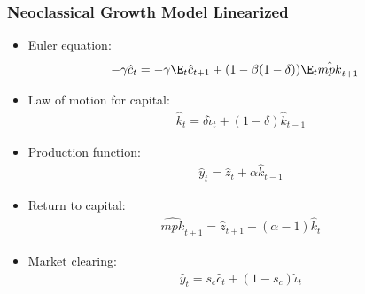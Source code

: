\documentclass[english,xcolor=svgnames]{beamer}
\begin{document}
 \begin{frame}
	\frametitle{Neoclassical Growth Model Linearized}
	\begin{itemize}
		\item Euler equation:
		\begin{align*}
			-\gamma \hat{c}_t &= -\gamma \E_t \hat{c}_{t+1} + (1 - \beta(1-\delta)) \E_t \hat{mpk}_{t+1}
		\end{align*}
		\item Law of motion for capital:
		\begin{align*}
			\hat{k}_{t} =\delta \hat{\iota}_{t} + (1-\delta)\hat{k}_{t-1}
		\end{align*}
		\item Production function:
		\begin{align*}
			\hat{y}_t = \hat{z}_t + \alpha \hat{k}_{t-1}
		\end{align*}
		\item Return to capital:
		\begin{align*}
			\hat{mpk}_{t+1} =  \hat{z}_{t+1} + (\alpha-1) \hat{k}_t 
		\end{align*}
		\item Market clearing:
		\begin{align*}
			\hat{y}_t = s_c \hat{c}_t +(1-s_c) \hat{\iota}_t
		\end{align*}
	 \end{itemize}
 \end{frame}
\end{document}
